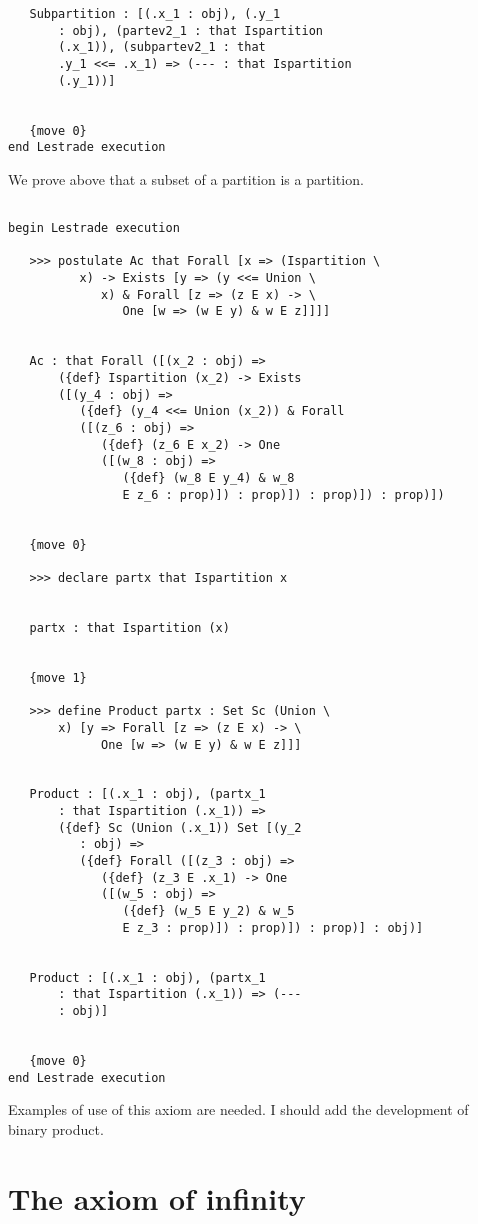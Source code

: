 \documentclass[12pt]{article}
\begin{document}
\begin{verbatim}
   Subpartition : [(.x_1 : obj), (.y_1 
       : obj), (partev2_1 : that Ispartition 
       (.x_1)), (subpartev2_1 : that 
       .y_1 <<= .x_1) => (--- : that Ispartition 
       (.y_1))]


   {move 0}
end Lestrade execution
\end{verbatim}

We prove above that a subset of a partition is a partition.

\begin{verbatim}

begin Lestrade execution

   >>> postulate Ac that Forall [x => (Ispartition \
          x) -> Exists [y => (y <<= Union \
             x) & Forall [z => (z E x) -> \
                One [w => (w E y) & w E z]]]]


   Ac : that Forall ([(x_2 : obj) => 
       ({def} Ispartition (x_2) -> Exists 
       ([(y_4 : obj) => 
          ({def} (y_4 <<= Union (x_2)) & Forall 
          ([(z_6 : obj) => 
             ({def} (z_6 E x_2) -> One 
             ([(w_8 : obj) => 
                ({def} (w_8 E y_4) & w_8 
                E z_6 : prop)]) : prop)]) : prop)]) : prop)])


   {move 0}

   >>> declare partx that Ispartition x


   partx : that Ispartition (x)


   {move 1}

   >>> define Product partx : Set Sc (Union \
       x) [y => Forall [z => (z E x) -> \
             One [w => (w E y) & w E z]]]


   Product : [(.x_1 : obj), (partx_1 
       : that Ispartition (.x_1)) => 
       ({def} Sc (Union (.x_1)) Set [(y_2 
          : obj) => 
          ({def} Forall ([(z_3 : obj) => 
             ({def} (z_3 E .x_1) -> One 
             ([(w_5 : obj) => 
                ({def} (w_5 E y_2) & w_5 
                E z_3 : prop)]) : prop)]) : prop)] : obj)]


   Product : [(.x_1 : obj), (partx_1 
       : that Ispartition (.x_1)) => (--- 
       : obj)]


   {move 0}
end Lestrade execution
\end{verbatim}

Examples of use of this axiom are needed.  I should add the development of binary product.


\section{The axiom of infinity}
\end{document}
